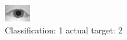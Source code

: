 \begin{figure}[h!]
\begin{center}
\includegraphics[width=0.60\columnwidth]{figures/ID983_class_1_target_2.png}
\end{center}
\caption{ Classification: 1 actual target: 2}
\label{fig:ID983_class_1_target_2}
\end{figure}
